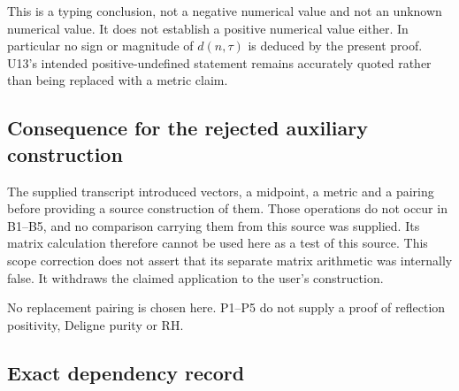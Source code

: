 This is a typing conclusion, not a negative numerical value and not an
unknown numerical value. It does not establish a positive numerical
value either. In particular no sign or magnitude of \(d(n,\tau)\) is
deduced by the present proof. U13's intended positive-undefined
statement remains accurately quoted rather than being replaced with a
metric claim.

\subsection{Consequence for the rejected auxiliary
construction}\label{uad-consequence-for-the-rejected-auxiliary-construction}

The supplied transcript introduced vectors, a midpoint, a metric and a
pairing before providing a source construction of them. Those operations
do not occur in B1--B5, and no comparison carrying them from this source
was supplied. Its matrix calculation therefore cannot be used here as a
test of this source. This scope correction does not assert that its
separate matrix arithmetic was internally false. It withdraws the
claimed application to the user's construction.

No replacement pairing is chosen here. P1--P5 do not supply a proof of
reflection positivity, Deligne purity or RH.

\subsection{Exact dependency record}\label{uad-exact-dependency-record}

